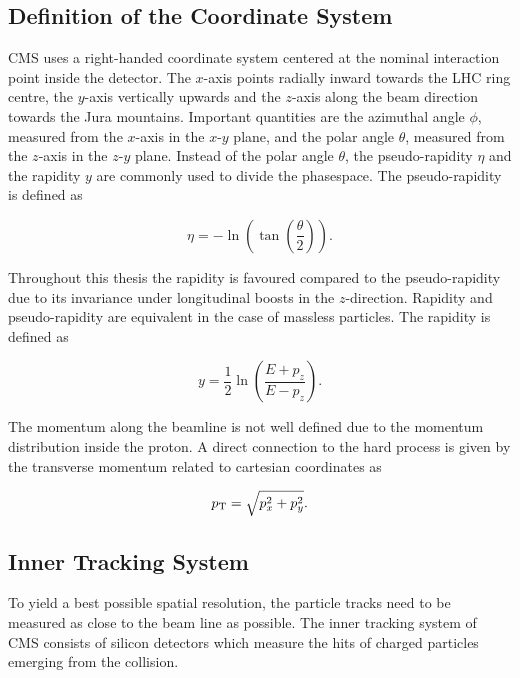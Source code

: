 \subsection{Definition of the Coordinate System}

CMS uses a right-handed coordinate system centered at the nominal interaction point inside the
detector. The $x$-axis points radially inward towards the LHC ring centre, the
$y$-axis vertically upwards and the $z$-axis along the beam direction towards
the Jura mountains. Important quantities are the azimuthal angle $\phi$,
measured from the $x$-axis in the $x$-$y$ plane, and the polar angle $\theta$,
measured from the $z$-axis in the $z$-$y$ plane. Instead of the polar angle
$\theta$, the pseudo-rapidity $\eta$ and the rapidity $y$ are commonly used to
divide the phasespace. The pseudo-rapidity is defined as

\begin{equation*}
    \eta = - \ln \left( \tan \left( \frac{\theta}{2} \right) \right).
\end{equation*}

Throughout this thesis the rapidity is favoured compared to the pseudo-rapidity
due to its invariance under longitudinal boosts in the $z$-direction. Rapidity
and pseudo-rapidity are equivalent in the case of massless particles. The
rapidity is defined as

\begin{equation*}
    y = \frac{1}{2} \ln \left( \frac{E + p_z}{E - p_z} \right).
\end{equation*}

The momentum along the beamline is not well defined due to the momentum
distribution inside the proton. A direct connection to the hard process is given
by the transverse momentum \pt related to cartesian coordinates as

\begin{equation*}
    p_{\mathrm{T}} = \sqrt{p_x^2 + p_y^2}.
\end{equation*}

\subsection{Inner Tracking System}

To yield a best possible spatial resolution, the particle tracks need to be
measured as close to the beam line as possible. The inner tracking system of CMS
consists of silicon detectors which measure the hits of charged
particles emerging from the collision. 

